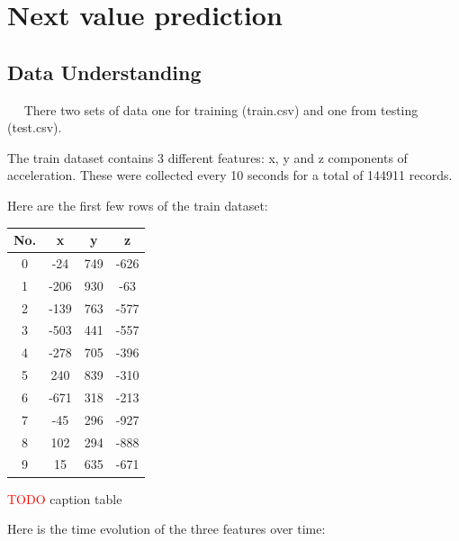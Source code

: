 \chapter*{Next value prediction}

\section*{Data Understanding}\label{Data Understanding}

~~ There two sets of data one for training (train.csv) and one from testing (test.csv).

The train dataset contains 3 different features: x, y and z components of acceleration. These were collected every 10 seconds for a total of 144911 records. 

Here are the first few rows of the train dataset:

\begin{center}
\begin{tabular}{| c | c | c | c |} 
\hline
No. & x & y & z \\ [0.5ex] 
\hline
\hline
 0 & -24 & 749 & -626 \\
\hline
1 & -206 & 930 &  -63 \\
\hline
2 & -139 & 763 & -577 \\
\hline
3 & -503 & 441 & -557 \\
\hline
4 & -278 & 705 & -396 \\
\hline
5 &  240 & 839 & -310 \\
\hline
6 & -671 & 318 & -213 \\
\hline
7  & -45 & 296 & -927 \\
\hline
8 &  102 & 294 & -888 \\
\hline
9 &   15 & 635 & -671 \\ [1ex] 
\hline
\end{tabular}
\end{center}

\textcolor{red}{TODO} caption table

Here is the time evolution of the three features over time:


